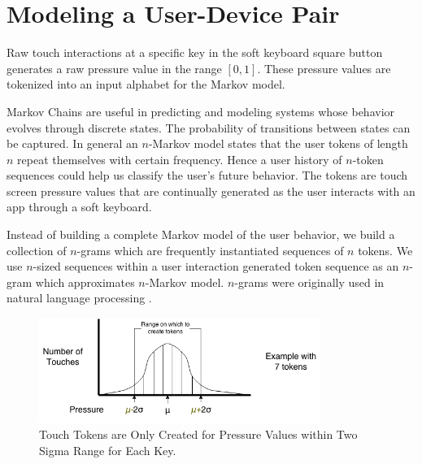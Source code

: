 \documentclass{acm_proc_article-sp}
\begin{document}
\section{Modeling a User-Device Pair}
\label{sec:modeling}
Raw touch interactions at a specific key in the soft keyboard square button
generates a raw pressure value in the range $[0,1]$. These pressure values are tokenized
into an input alphabet for the Markov model. 
 

Markov Chains are useful in predicting and modeling systems whose behavior evolves through discrete states. The probability of transitions between states can be captured.
In general an $n$-Markov model states that the
user tokens of length $n$ repeat themselves with certain frequency. Hence a user history
of $n$-token sequences could help us classify the user's future behavior. The tokens are
touch screen pressure values that are continually generated as the user interacts with an app
through a soft keyboard.


Instead of building a complete Markov model of the user behavior, we build a collection of $n$-grams
which are frequently instantiated sequences of $n$ tokens.
We use $n$-sized sequences  within a user interaction generated token sequence as an
$n$-gram which approximates $n$-Markov model. $n$-grams were originally
used in natural language processing \cite{Brown:ngram}.

\begin{figure}
\centering
\includegraphics[width=3.6in]{token_creation.png}
\caption{Touch Tokens are Only Created for Pressure Values within Two Sigma Range for Each Key.}
\label{fig:token_creation}
\end{figure}
\end{document}
